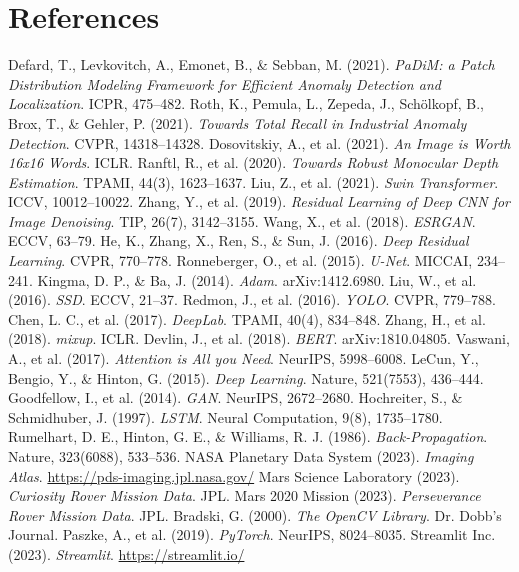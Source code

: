 \documentclass[12pt]{article}
\begin{document}
\section{References}
\begin{thebibliography}{99}
 Defard, T., Levkovitch, A., Emonet, B., \& Sebban, M. (2021). \textit{PaDiM: a Patch Distribution Modeling Framework for Efficient Anomaly Detection and Localization}. ICPR, 475--482.
 Roth, K., Pemula, L., Zepeda, J., Schölkopf, B., Brox, T., \& Gehler, P. (2021). \textit{Towards Total Recall in Industrial Anomaly Detection}. CVPR, 14318--14328.
 Dosovitskiy, A., et al. (2021). \textit{An Image is Worth 16x16 Words}. ICLR.
 Ranftl, R., et al. (2020). \textit{Towards Robust Monocular Depth Estimation}. TPAMI, 44(3), 1623--1637.
 Liu, Z., et al. (2021). \textit{Swin Transformer}. ICCV, 10012--10022.
 Zhang, Y., et al. (2019). \textit{Residual Learning of Deep CNN for Image Denoising}. TIP, 26(7), 3142--3155.
 Wang, X., et al. (2018). \textit{ESRGAN}. ECCV, 63--79.
 He, K., Zhang, X., Ren, S., \& Sun, J. (2016). \textit{Deep Residual Learning}. CVPR, 770--778.
 Ronneberger, O., et al. (2015). \textit{U-Net}. MICCAI, 234--241.
 Kingma, D. P., \& Ba, J. (2014). \textit{Adam}. arXiv:1412.6980.
 Liu, W., et al. (2016). \textit{SSD}. ECCV, 21--37.
 Redmon, J., et al. (2016). \textit{YOLO}. CVPR, 779--788.
 Chen, L. C., et al. (2017). \textit{DeepLab}. TPAMI, 40(4), 834--848.
 Zhang, H., et al. (2018). \textit{mixup}. ICLR.
 Devlin, J., et al. (2018). \textit{BERT}. arXiv:1810.04805.
 Vaswani, A., et al. (2017). \textit{Attention is All you Need}. NeurIPS, 5998--6008.
 LeCun, Y., Bengio, Y., \& Hinton, G. (2015). \textit{Deep Learning}. Nature, 521(7553), 436--444.
 Goodfellow, I., et al. (2014). \textit{GAN}. NeurIPS, 2672--2680.
 Hochreiter, S., \& Schmidhuber, J. (1997). \textit{LSTM}. Neural Computation, 9(8), 1735--1780.
 Rumelhart, D. E., Hinton, G. E., \& Williams, R. J. (1986). \textit{Back-Propagation}. Nature, 323(6088), 533--536.
 NASA Planetary Data System (2023). \textit{Imaging Atlas}. \url{https://pds-imaging.jpl.nasa.gov/}
 Mars Science Laboratory (2023). \textit{Curiosity Rover Mission Data}. JPL.
 Mars 2020 Mission (2023). \textit{Perseverance Rover Mission Data}. JPL.
 Bradski, G. (2000). \textit{The OpenCV Library}. Dr. Dobb's Journal.
 Paszke, A., et al. (2019). \textit{PyTorch}. NeurIPS, 8024--8035.
 Streamlit Inc. (2023). \textit{Streamlit}. \url{https://streamlit.io/}
\end{thebibliography}
\end{document}
